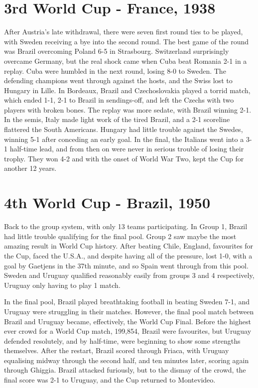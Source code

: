 \section{3rd World Cup - France, 1938}
After Austria's late withdrawal, there were seven first round ties to be 
played, with Sweden receiving a bye into the second round. The best game of the
round was Brazil overcoming Poland 6-5 in Strasbourg. Switzerland surprisingly 
overcame Germany, but the real shock came when Cuba beat Romania 2-1 in a 
replay. Cuba were humbled in the next round, losing 8-0 to Sweden. The 
defending champions went through against the hosts, and the Swiss lost to 
Hungary in Lille. In Bordeaux, Brazil and Czechoslovakia played a torrid match,
which ended 1-1, 2-1 to Brazil in sendings-off, and left the Czechs with two 
players with broken bones. The replay was more sedate, with Brazil winning 2-1.
In the semis, Italy made light work of the tired Brazil, and a 2-1 scoreline 
flattered the South Americans. Hungary had little trouble against the Swedes, 
winning 5-1 after conceding an early goal. In the final, the Italians went 
into a 3-1 half-time lead, and from then on were never in serious trouble of 
losing their trophy. They won 4-2 and with the onset of World War Two, kept the
Cup for another 12 years.
\section{4th World Cup - Brazil, 1950}
Back to the group system, with only 13 teams participating. In Group 1, Brazil 
had little trouble qualifying for the final pool. Group 2 saw maybe the most 
amazing result in World Cup history. After beating Chile, England, favourites 
for the Cup, faced the U.S.A., and despite having all of the pressure, lost 
1-0, with a goal by Gaetjens in the 37th minute, and so Spain went through from 
this pool. Sweden and Uruguay qualified reasonably easily from groups 3 and 4 
respectively, Uruguay only having to play 1 match.

In the final pool, Brazil played breathtaking football in beating Sweden 7-1, 
and Uruguay were struggling in their matches. However, the final pool match 
between Brazil and Uruguay became, effectively, the World Cup Final. Before the
highest ever crowd for a World Cup match, 199,854, Brazil were favourites, but 
Uruguay defended resolutely, and by half-time, were beginning to show some 
strengths themselves. After the restart, Brazil scored through Friaca, with 
Uruguay equalising midway through the second half, and ten minutes later, 
scoring again through Ghiggia. Brazil attacked furiously, but to the dismay of
the crowd, the final score was 2-1 to Uruguay, and the Cup returned to 
Montevideo.
